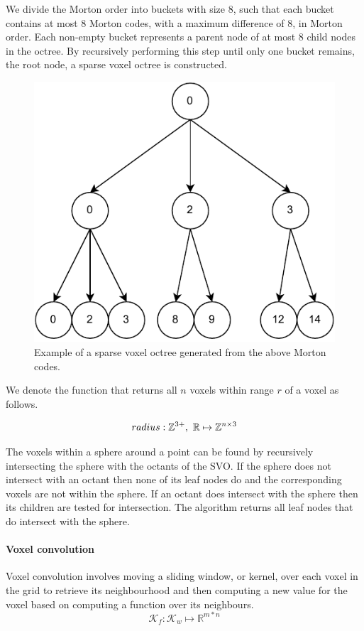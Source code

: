 We divide the Morton order into buckets with size 8, such that each bucket contains at most 8 Morton codes, with a maximum difference of 8, in Morton order. Each non-empty bucket represents a parent node of at most 8 child nodes in the octree. By recursively performing this step until only one bucket remains, the root node, a sparse voxel octree is constructed. 

\begin{figure}[h]
    \centering
    \includegraphics*[width=.5\textwidth]{./fig/svo.pdf}
    \caption{Example of a sparse voxel octree generated from the above Morton codes.}
    \label{fig:vg_svo}
\end{figure}



We denote the function that returns all \(n\) voxels within range \(r\) of a voxel as follows.

\begin{equation}
    radius: \mathbb{Z}^{3+},\ \mathbb{R} \mapsto \mathbb{Z}^{n \times 3}
\end{equation}

The voxels within a sphere around a point can be found by recursively intersecting the sphere with the octants of the SVO. If the sphere does not intersect with an octant then none of its leaf nodes do and the corresponding voxels are not within the sphere. If an octant does intersect with the sphere then its children are tested for intersection. The algorithm returns all leaf nodes that do intersect with the sphere.

\paragraph{Voxel convolution}
Voxel convolution involves moving a sliding window, or kernel, over each voxel in the grid to retrieve its neighbourhood and then computing a new value for the voxel based on computing a function  over its neighbours.
\begin{equation}
    \label{eq:convolution}
    \mathcal{K}_f: \mathcal{K}_w \mapsto \mathbb{R}^{m*n}
\end{equation}

